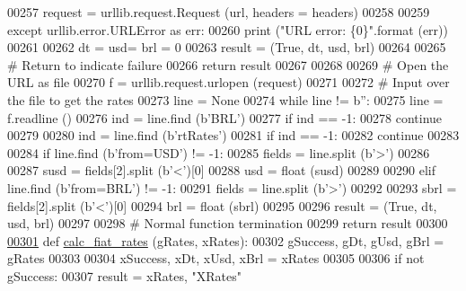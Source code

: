 \begin{DoxyCode}
{{{00257         request = urllib.request.Request (url, headers = headers)
00258         
00259     \textcolor{keywordflow}{except} urllib.error.URLError \textcolor{keyword}{as} err:
00260         \textcolor{keywordflow}{print} (\textcolor{stringliteral}{"URL error: \{0\}"}.format (err))
00261         
00262         dt = usd= brl = 0
00263         result = (\textcolor{keyword}{True}, dt, usd, brl)
00264         
00265         \textcolor{comment}{# Return to indicate failure}
00266         \textcolor{keywordflow}{return} result
00267 
00268         
00269     \textcolor{comment}{# Open the URL as file}
00270     f = urllib.request.urlopen (request)
00271     
00272     \textcolor{comment}{# Input over the file to get the rates}
00273     line = \textcolor{keywordtype}{None}
00274     \textcolor{keywordflow}{while} line != b\textcolor{stringliteral}{''}:
00275         line = f.readline ()
00276         ind = line.find (b\textcolor{stringliteral}{'BRL'})
00277         \textcolor{keywordflow}{if} ind == -1:
00278             \textcolor{keywordflow}{continue} 
00279         
00280         ind = line.find (b\textcolor{stringliteral}{'rtRates'})
00281         \textcolor{keywordflow}{if} ind == -1:
00282             \textcolor{keywordflow}{continue} 
00283                 
00284         \textcolor{keywordflow}{if} line.find (b\textcolor{stringliteral}{'from=USD'}) != -1:
00285             fields = line.split (b\textcolor{stringliteral}{'>'})
00286             
00287             susd = fields[2].split (b\textcolor{stringliteral}{'<'})[0]
00288             usd = float (susd)
00289         
00290         \textcolor{keywordflow}{elif} line.find (b\textcolor{stringliteral}{'from=BRL'}) != -1:
00291             fields = line.split (b\textcolor{stringliteral}{'>'})
00292             
00293             sbrl = fields[2].split (b\textcolor{stringliteral}{'<'})[0]
00294             brl = float (sbrl)
00295             
00296     result = (\textcolor{keyword}{True}, dt, usd, brl)
00297     
00298     \textcolor{comment}{# Normal function termination}
00299     \textcolor{keywordflow}{return} result
00300     
\hypertarget{exch2exch_8py_source.tex_l00301}{}\hyperlink{namespaceexch2exch_a2f3337121882596d0644f2d48ffb870c}{00301} \textcolor{keyword}{def }\hyperlink{namespaceexch2exch_a2f3337121882596d0644f2d48ffb870c}{calc\_fiat\_rates} (gRates, xRates):
00302     gSuccess, gDt, gUsd, gBrl = gRates 
00303     
00304     xSuccess, xDt, xUsd, xBrl = xRates
00305     
00306     \textcolor{keywordflow}{if} \textcolor{keywordflow}{not} gSuccess:
00307         result = xRates, \textcolor{stringliteral}{"XRates"}
}}}
\end{DoxyCode}

